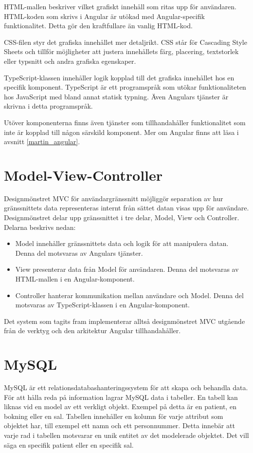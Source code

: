 HTML-mallen beskriver vilket grafiskt innehåll som ritas upp för användaren. HTML-koden som skrivs i Angular är utökad med Angular-specifik funktionalitet. Detta gör den kraftfullare än vanlig HTML-kod.

CSS-filen styr det grafiska innehållet mer detaljrikt. CSS står för Cascading Style Sheets och tillför möjligheter att justera innehållets färg, placering, textstorlek eller typsnitt och andra grafiska egenskaper.

TypeScript-klassen innehåller logik kopplad till det grafiska innehållet hos en specifik komponent. TypeScript är ett programspråk som utökar funktionaliteten hos JavaScript med bland annat statisk typning. Även Angulars tjänster är skrivna i detta programspråk.

Utöver komponenterna finns även tjänster som tillhandahåller funktionalitet som inte är kopplad till någon särskild komponent. Mer om Angular finns att läsa i avsnitt \ref{martin_angular}.

\section{Model-View-Controller} \label{mvc-ref}

Designmönstret MVC för användargränssnitt möjliggör separation av hur gränssnittets data representeras internt från sättet datan visas upp för användare. Designmönstret delar upp gränssnittet i tre delar, Model, View och Controller.\cite{mvc} Delarna beskrivs nedan:
\begin{itemize}
  \item Model innehåller gränssnittets data och logik för att manipulera datan. Denna del motsvaras av Angulars tjänster.
  \item View presenterar data från Model för användaren. Denna del motsvaras av HTML-mallen i en Angular-komponent.
  \item Controller hanterar kommunikation mellan användare och Model. Denna del motsvaras av TypeScript-klassen i en Angular-komponent.
\end{itemize}

Det system som tagits fram implementerar alltså designmönstret MVC utgående från de verktyg och den arkitektur Angular tillhandahåller.

\section{MySQL}
MySQL är ett relationsdatabashanteringssystem för att skapa och behandla data. För att hålla reda på
information lagrar MySQL data i tabeller. En tabell kan liknas vid en model av ett verkligt objekt.
Exempel på detta är en patient, en bokning eller en sal. \cite{mysql} Tabellen innehåller en kolumn för varje
attribut som objektet har, till exempel ett namn och ett personnummer. Detta innebär att varje rad i
tabellen motsvarar en unik entitet av det modelerade objektet. Det vill säga en specifik patient eller
en specifik sal.

